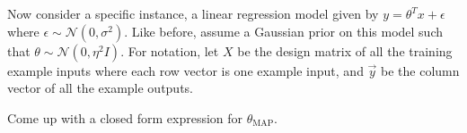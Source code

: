 \item {} 
Now consider a specific instance, a linear regression model given by
$y=\theta^T x + \epsilon$ where $\epsilon \sim \mathcal{N}(0,\sigma^2)$. Like before, assume a
Gaussian prior on this model such that $\theta \sim \mathcal{N}(0,\eta^2 I)$.
For notation, let $X$ be the design matrix of all the training example inputs where
each row vector is one example input, and $\vec{y}$ be the column vector of
all the example outputs.

Come up with a closed form expression for $\theta_\text{MAP}$.

\ifnum{} {
  
} \fi
